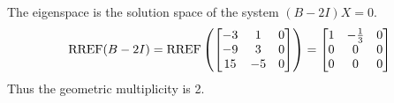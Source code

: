 \documentclass{sbgLAquiz}
\begin{document}
\begin{solution}
The eigenspace is the solution space of the system $(B-2I)X=0$.
$$\operatorname{RREF}(B-2I)=\operatorname{RREF}\left(\begin{bmatrix} -3 & 1 & 0 \\ -9 & 3 & 0 \\ 15 & - 5 & 0 \end{bmatrix} \right) = \begin{bmatrix} 1 & -\frac{1}{3} & 0 \\ 0 & 0 & 0 \\ 0 & 0 & 0 \end{bmatrix}$$
Thus the geometric multiplicity is 2.
\end{solution}
\end{document}
